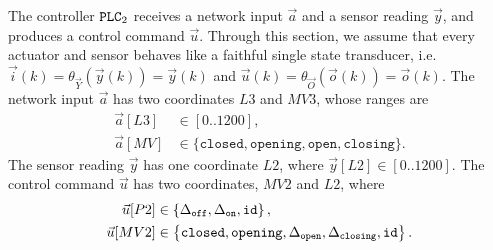 {{The controller $\texttt{PLC}_2$ receives a network input $\vec{a}$ and a sensor reading $\vec{y}$, and produces a control command $\vec{u}$. Through this section, we assume that every actuator and sensor behaves like a faithful single state transducer, i.e. $\vec{i}(k)=\theta_{\vec{Y}}(\vec{y}(k))=\vec{y}(k)$ and $\vec{u}(k)=\theta_{\vec{O}}(\vec{o}(k))=\vec{o}(k)$. 
The network input $\vec{a}$ has two coordinates $L3$ and $MV3$, whose ranges are 
\begin{align*}
  \vec{a}[L3]&\in[0..1200],\\ 
  \vec{a}[MV]&\in \{\texttt{closed},\texttt{opening},\texttt{open},\texttt{closing}\}.
\end{align*} 
The sensor reading $\vec{y}$ has one coordinate $L2$, where $\vec{y}[L2]\in[0..1200]$. 
The control command $\vec{u}$ has two coordinates, $MV2$ and $L2$, where 
\begin{align*}
  \vec{u}[P2]&\in\left\{{\Delta}_\texttt{off},{\Delta}_\texttt{on},{\texttt{id}}\right\},\\
  \vec{u}[MV2]&\in\left\{\texttt{closed},\texttt{opening},{\Delta}_\texttt{open},{\Delta}_\texttt{closing}, {\texttt{id}}\right\}.
\end{align*}

}}
